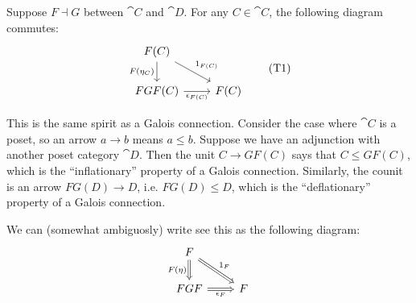 \documentclass[12pt]{article}
\begin{document}
\begin{proposition}
	Suppose $F\dashv G$ between $\cat{C}$ and $\cat{D}$. For any $C\in \cat{C}$, the following diagram commutes:
	\begin{equation*}
\begin{tikzcd}
F(C) \arrow[d, "F(\eta_C)"'] \arrow[rd, "1_{F(C)}"] &      \\
FGF(C) \arrow[r, "\epsilon_{F(C)}"']                & F(C)
\end{tikzcd}
	\tag{T1}
	\end{equation*}
\end{proposition}

\begin{remark}
	This is the same spirit as a Galois connection. Consider the case where $\cat{C}$ is a poset, so an arrow $a\to b$ means $a\leq b$. Suppose we have an adjunction with another poset category $\cat{D}$. Then the unit $C\to GF(C)$ says that $C\leq GF(C)$, which is the ``inflationary'' property of a Galois connection. Similarly, the counit is an arrow $FG(D)\to D$, i.e. $FG(D)\leq D$, which is the ``deflationary'' property of a Galois connection.
\end{remark}

\begin{remark}
	We can (somewhat ambiguosly) write see this as the following diagram:
	\begin{equation*}
\begin{tikzcd}
F \arrow[d, "F(\eta)"', Rightarrow] \arrow[rd, "1_F", Rightarrow] &   \\
FGF \arrow[r, "\epsilon_F"', Rightarrow]                          & F
\end{tikzcd}
	\end{equation*}
\end{remark}
\end{document}
